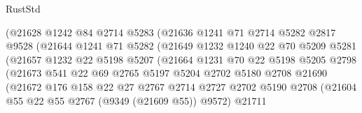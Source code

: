 \begin{lexlean}{RustStd}
\begin{coremodule}
                            (@21628
                              @1242
                              @84
                              @2714
                              @5283
                              (@21636
                                @1241
                                @71
                                @2714
                                @5282
                                @2817
                                @9528
                                (@21644
                                  @1241
                                  @71
                                  @5282
                                  (@21649
                                    @1232
                                    @1240
                                    @22
                                    @70
                                    @5209
                                    @5281
                                    (@21657
                                      @1232
                                      @22
                                      @5198
                                      @5207
                                      (@21664
                                        @1231
                                        @70
                                        @22
                                        @5198
                                        @5205
                                        @2798
                                        (@21673
                                          @541
                                          @22
                                          @69
                                          @2765
                                          @5197
                                          @5204
                                          @2702
                                          @5180
                                          @2708
                                          @21690
                                          (@21672
                                            @176
                                            @158
                                            @22
                                            @27
                                            @2767
                                            @2714
                                            @2727
                                            @2702
                                            @5190
                                            @2708
                                            (@21604 @55 @22 @55 @2767 (@9349 (@21609 @55)) @9572)
                                            @21711

\end{coremodule}
\end{lexlean}
